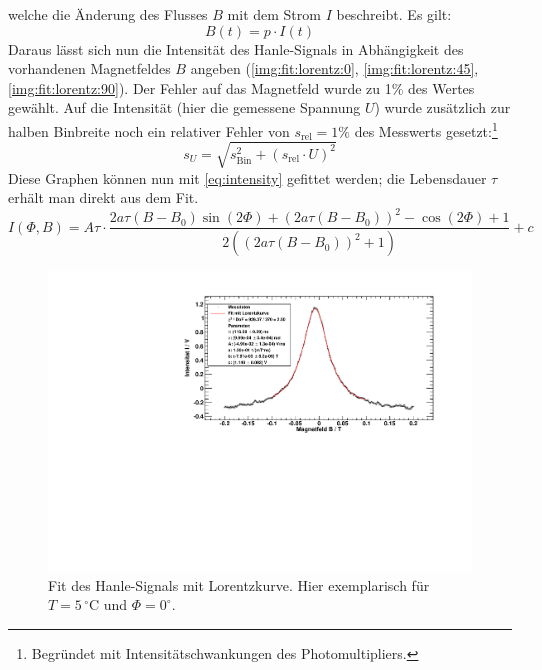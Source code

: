 welche die Änderung des Flusses $B$ mit dem Strom $I$ beschreibt. 
Es gilt:
\begin{equation}
  B(t) = p \cdot I(t)
\end{equation}
Daraus lässt sich nun die Intensität des Hanle-Signals in Abhängigkeit des vorhandenen Magnetfeldes $B$ angeben (\autoref{img:fit:lorentz:0}, 
\autoref{img:fit:lorentz:45}, \autoref{img:fit:lorentz:90}).
Der Fehler auf das Magnetfeld wurde zu 1\% des Wertes gewählt. Auf die Intensität (hier die gemessene Spannung $U$) wurde zusätzlich zur halben Binbreite 
noch ein relativer Fehler von \mbox{$ s_\text{rel} = 1\% $} des Messwerts gesetzt:\footnote{Begründet mit Intensitätschwankungen des Photomultipliers.}
\begin{equation}
  s_U = \sqrt{s_{\text{Bin}}^2 + (s_\text{rel} \cdot U)^2}
\end{equation}
Diese Graphen können nun mit \autoref{eq:intensity} gefittet werden;
die Lebensdauer $\tau$ erhält man direkt aus dem Fit.
\begin{equation}
I(\Phi,B) = A \tau \cdot \frac{2 a \tau  (B-B_0) \sin (2 \Phi )+(2 a \tau  (B-B_0))^2-\cos (2 \Phi )+1}
{2 \left((2 a \tau  (B-B_0))^2+1\right)}+c 
\end{equation}
\begin{figure}[H]
\begin{center}
  \includegraphics[width=\textwidth]{../img/fit_00_p05_1.pdf}
  \caption{Fit des Hanle-Signals mit Lorentzkurve. Hier exemplarisch für $T=5\,{}^\circ$C und $\Phi=0^\circ$.}
  \label{img:fit:lorentz:0}
\end{center}
\end{figure}
